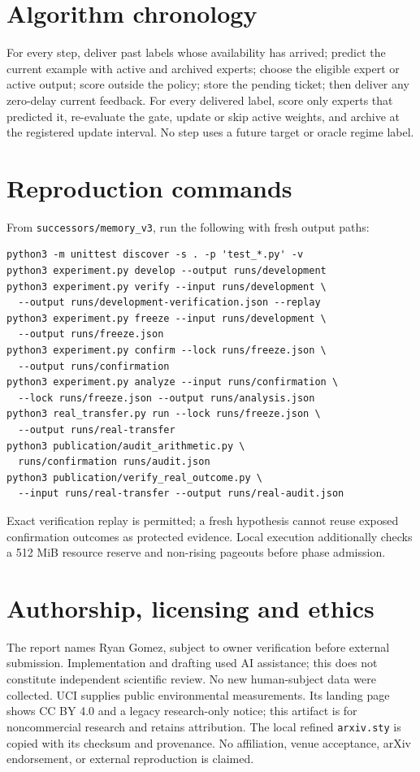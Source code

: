 \documentclass[10pt]{article}
\begin{document}
\section{Algorithm chronology}
For every step, deliver past labels whose availability has arrived; predict the current example with active and archived experts; choose the eligible expert or active output; score outside the policy; store the pending ticket; then deliver any zero-delay current feedback. For every delivered label, score only experts that predicted it, re-evaluate the gate, update or skip active weights, and archive at the registered update interval. No step uses a future target or oracle regime label.

\section{Reproduction commands}
From \texttt{successors/memory\_v3}, run the following with fresh output paths:
\begin{verbatim}
python3 -m unittest discover -s . -p 'test_*.py' -v
python3 experiment.py develop --output runs/development
python3 experiment.py verify --input runs/development \
  --output runs/development-verification.json --replay
python3 experiment.py freeze --input runs/development \
  --output runs/freeze.json
python3 experiment.py confirm --lock runs/freeze.json \
  --output runs/confirmation
python3 experiment.py analyze --input runs/confirmation \
  --lock runs/freeze.json --output runs/analysis.json
python3 real_transfer.py run --lock runs/freeze.json \
  --output runs/real-transfer
python3 publication/audit_arithmetic.py \
  runs/confirmation runs/audit.json
python3 publication/verify_real_outcome.py \
  --input runs/real-transfer --output runs/real-audit.json
\end{verbatim}
Exact verification replay is permitted; a fresh hypothesis cannot reuse exposed confirmation outcomes as protected evidence. Local execution additionally checks a 512 MiB resource reserve and non-rising pageouts before phase admission.

\section{Authorship, licensing and ethics}
The report names Ryan Gomez, subject to owner verification before external submission. Implementation and drafting used AI assistance; this does not constitute independent scientific review. No new human-subject data were collected. UCI supplies public environmental measurements. Its landing page shows CC BY 4.0 and a legacy research-only notice; this artifact is for noncommercial research and retains attribution. The local refined \texttt{arxiv.sty} is copied with its checksum and provenance. No affiliation, venue acceptance, arXiv endorsement, or external reproduction is claimed.
\end{document}
